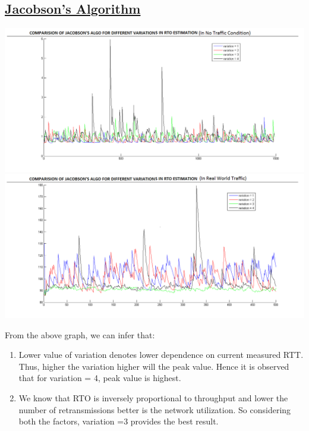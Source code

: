 \documentclass[12pt]{article}
\begin{document}
\subsection{\underline{Jacobson's Algorithm}}
\begin{center}
 \includegraphics[scale=0.5]{jacob.png}
\includegraphics[scale=0.5]{jacob1.png}
\end{center}
From the above graph, we can infer that:
\begin{enumerate}
\item Lower value of variation denotes lower dependence on current measured RTT. Thus, higher the variation higher will the peak value. Hence it is observed that for variation = 4, peak value is highest.
\item We know that RTO is inversely proportional to throughput and lower the number of retransmissions better is the network utilization. So considering both the factors, variation =3 provides the best result.
\end{enumerate}
\end{document}
